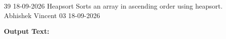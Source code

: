 \clearpage
\label{prog:39}
\programhead
  {39}
  {18-09-2026}
  {Heapsort}
  {Sorts an array in ascending order using heapsort.}
  {Abhishek Vincent}
  {03}
  {18-09-2026}

\divider
\textbf{Output Text:}\par
\vspace{2pt}

